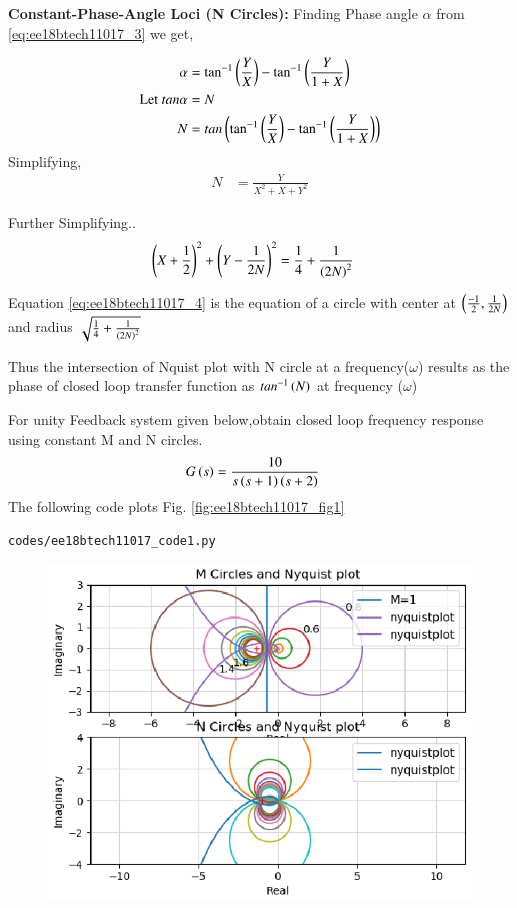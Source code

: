 \textbf{Constant-Phase-Angle Loci (N Circles):}
Finding Phase angle $\alpha$ from \eqref{eq:ee18btech11017_3} we get,

\begin{align}
\alpha &= \tan^{-1}\left(\frac{Y}{X}\right)-\tan^{-1}\left(\frac{Y}{1+X}\right)
\\
\text{Let } tan\alpha &= N
\\
N &= tan\left(\tan^{-1}\left(\frac{Y}{X}\right)-\tan^{-1}\left(\frac{Y}{1+X}\right)\right)
\end{align}
Simplifying,
\begin{align}
N &= \frac{Y}{X^{2}+X+Y^{2}}
\end{align}

Further Simplifying..
\begin{align}
\left(X+\frac{1}{2}\right)^{2}+\left(Y-\frac{1}{2N}\right)^{2} &= \frac{1}{4}+\frac{1}{\left(2N\right)^{2}}
\label{eq:ee18btech11020_4}
\end{align}

Equation \eqref{eq:ee18btech11017_4} is the equation of a circle with center at $\left(\frac{-1}{2},\frac{1}{2N}\right)$ and radius $\sqrt{\frac{1}{4}+\frac{1}{\left(2N\right)^{2}}}$


Thus the intersection of Nquist plot with N circle at a frequency($\omega$) results as the phase of closed loop transfer function as $tan^{-1}\left(N\right)$ at frequency ($\omega$)


\item
For unity Feedback system given below,obtain closed loop frequency response using constant M and N circles.
\begin{align}
G\left(s\right) &=\frac{10}{s\left(s+1\right)\left(s+2\right)}
\end{align}
\solution 
The following code plots Fig. \ref{fig:ee18btech11017_fig1}
\begin{lstlisting}
codes/ee18btech11017_code1.py
\end{lstlisting}


\begin{figure}[!h]
  \includegraphics[width=\columnwidth]{./figs/ee18btech11020/Figure_1.eps}
 \caption{}
  \label{fig:ee18btech11020_fig1}
\end{figure}

